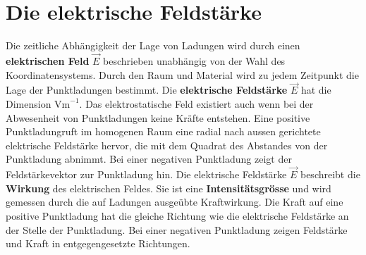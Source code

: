 \section{Die elektrische Feldstärke}
Die zeitliche Abhängigkeit der Lage von Ladungen wird durch einen \textbf{elektrischen Feld} $\overrightarrow{E}$ beschrieben unabhängig von der Wahl des Koordinatensystems. Durch den Raum und Material wird zu jedem Zeitpunkt die Lage der Punktladungen bestimmt. Die \textbf{elektrische Feldstärke} $\overrightarrow{E}$ hat die Dimension $\text{Vm}^{-1}$. Das elektrostatische Feld existiert auch wenn bei der Abwesenheit von Punktladungen keine Kräfte entstehen.
\newline\newline
Eine positive Punktladungruft im homogenen Raum eine radial nach aussen gerichtete elektrische Feldstärke hervor, die mit dem Quadrat des Abstandes von der Punktladung abnimmt. Bei einer negativen Punktladung zeigt der Feldstärkevektor zur Punktladung hin.
\newline\newline
Die elektrische Feldstärke $\overrightarrow{E}$ beschreibt die \textbf{Wirkung} des elektrischen Feldes. Sie ist eine \textbf{Intensitätsgrösse} und wird gemessen durch die auf Ladungen ausgeübte Kraftwirkung. 
\newline\newline
Die Kraft auf eine positive Punktladung hat die gleiche Richtung wie die elektrische Feldstärke an der Stelle der Punktladung. Bei einer negativen Punktladung zeigen Feldstärke und Kraft in entgegengesetzte Richtungen.
